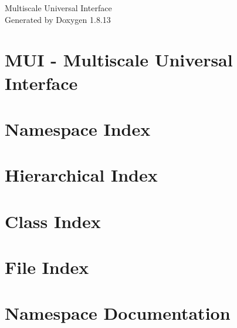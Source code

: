 \documentclass[twoside]{book}
\newcommand{\+}{\discretionary{\mbox{\scriptsize$\hookleftarrow$}}{}{}}
\newcommand{\clearemptydoublepage}{%
  \newpage{\pagestyle{empty}\cleardoublepage}%
}
\begin{document}
\hypersetup{pageanchor=false,
             bookmarksnumbered=true,
             pdfencoding=unicode
            }
\begin{titlepage}
\vspace*{7cm}
\begin{center}%
{\Large Multiscale Universal Interface }\\
\vspace*{1cm}
{\large Generated by Doxygen 1.8.13}\\
\end{center}
\end{titlepage}
\clearemptydoublepage
{}
\tableofcontents
\clearemptydoublepage
{}
\hypersetup{pageanchor=true}

\chapter{M\+UI -\/ Multiscale Universal Interface}
\label{md__r_e_a_d_m_e}

\chapter{Namespace Index}

\chapter{Hierarchical Index}

\chapter{Class Index}

\chapter{File Index}

\chapter{Namespace Documentation}











\end{document}
